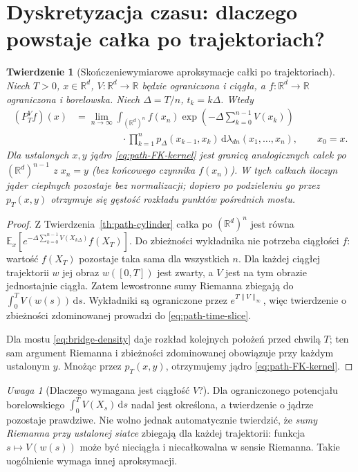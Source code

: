 \documentclass[11pt,a4paper,oneside]{report}
\numberwithin{equation}{chapter}
\theoremstyle{plain}
\newtheorem{twierdzenie}{Twierdzenie}[chapter]
\theoremstyle{definition}
\theoremstyle{remark}
\newtheorem{uwaga}{Uwaga}[chapter]
\newcommand{\R}{\mathbb{R}}
\newcommand{\E}{\mathbb{E}}
\newcommand{\dd}{\mathrm{d}}
\begin{document}
\section{Dyskretyzacja czasu: dlaczego powstaje całka po trajektoriach?}\label{sec:volIII:15:07}

\begin{twierdzenie}[Skończeniewymiarowe aproksymacje całki po trajektoriach]\label{thm:volIII:15:07}
\label{th:path-time-slice}
Niech $T>0$, $x\in\R^d$, $V:\R^d\to\R$ będzie
\emph{ograniczona i ciągła}, a $f:\R^d\to\R$
ograniczona i borelowska. Niech $\Delta=T/n$,
$t_k=k\Delta$. Wtedy
\[
\begin{split}
 (P_T^Vf)(x)&=\lim_{n\to\infty}
 \int_{(\R^d)^n}f(x_n)
 \exp\left(-\Delta\sum_{k=0}^{n-1}V(x_k)\right)\\
 &\hspace{2cm}\cdot\prod_{k=1}^n p_\Delta(x_{k-1},x_k)
 \,\dd\lambda_{dn}(x_1,\ldots,x_n),\qquad x_0=x.
\end{split}
\tag{15.10}\label{eq:path-time-slice}
\]
Dla ustalonych $x,y$ jądro \eqref{eq:path-FK-kernel}
jest granicą analogicznych całek po
$(\R^d)^{n-1}$ z $x_n=y$ (\emph{bez} końcowego
czynnika $f(x_n)$). W tych całkach iloczyn jąder
cieplnych pozostaje bez normalizacji; dopiero po
podzieleniu go przez $p_T(x,y)$ otrzymuje się gęstość
rozkładu punktów pośrednich mostu.
\end{twierdzenie}
\begin{proof}
Z Twierdzenia~\ref{th:path-cylinder} całka po
$(\R^d)^n$ jest równa
$\E_x[e^{-\Delta\sum_{k=0}^{n-1}V(X_{k\Delta})}f(X_T)]$.
Do zbieżności wykładnika nie potrzeba ciągłości $f$:
wartość $f(X_T)$ pozostaje taka sama dla wszystkich $n$.
Dla każdej ciągłej trajektorii $w$ jej obraz $w([0,T])$
jest zwarty, a $V$ jest na tym obrazie jednostajnie ciągła.
Zatem lewostronne sumy Riemanna zbiegają do
$\int_0^TV(w(s))\,\dd s$. Wykładniki są ograniczone
przez $e^{T\|V\|_\infty}$, więc twierdzenie o zbieżności
zdominowanej prowadzi do \eqref{eq:path-time-slice}.

Dla mostu \eqref{eq:bridge-density} daje rozkład
kolejnych położeń przed chwilą $T$; ten sam argument
Riemanna i zbieżności zdominowanej obowiązuje przy
każdym ustalonym $y$. Mnożąc przez $p_T(x,y)$,
otrzymujemy jądro \eqref{eq:path-FK-kernel}.
\end{proof}

\begin{uwaga}[Dlaczego wymagana jest ciągłość $V$?]
Dla ograniczonego potencjału borelowskiego
$\int_0^TV(X_s)\,\dd s$ nadal jest określona,
a twierdzenie o jądrze pozostaje prawdziwe.
Nie wolno jednak automatycznie twierdzić, że \emph{sumy
Riemanna przy ustalonej siatce} zbiegają dla każdej
trajektorii: funkcja $s\mapsto V(w(s))$ może być
nieciągła i niecałkowalna w sensie Riemanna.
Takie uogólnienie wymaga innej aproksymacji.
\end{uwaga}
\end{document}
